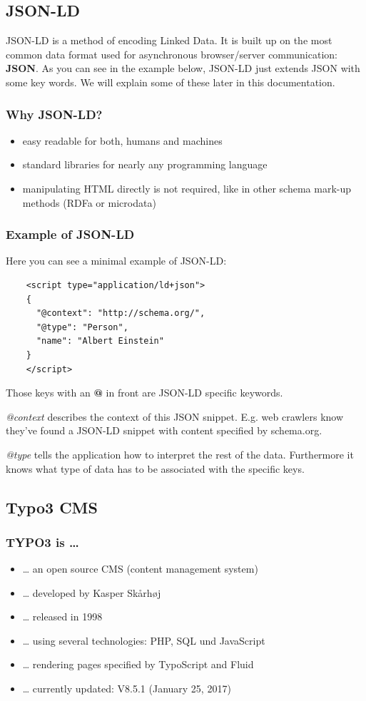 \documentclass[12pt]{article}
\begin{document}
\subsection{JSON-LD}
JSON-LD is a method of encoding Linked Data. It is built up on the most common data format used for asynchronous browser/server communication: \textbf{JSON}. As you can see in the example below, JSON-LD just extends JSON with some key words. We will explain some of these later in this documentation.

\subsubsection{Why JSON-LD?}
\begin{itemize}
	\item easy readable for both, humans and machines
	\item standard libraries for nearly any programming language
	\item manipulating HTML directly is not required, like in other schema mark-up methods (RDFa or microdata)
\end{itemize}

\subsubsection{Example of JSON-LD}
Here you can see a minimal example of JSON-LD:
\begin{lstlisting}
	<script type="application/ld+json">
	{
	  "@context": "http://schema.org/",
	  "@type": "Person",
	  "name": "Albert Einstein"
	}
	</script>
\end{lstlisting}
Those keys with an \textbf{@} in front are JSON-LD specific keywords. 

\emph{@context} describes the context of this JSON snippet. E.g. web crawlers know they've found a JSON-LD snippet with content specified by schema.org. 

\emph{@type} tells the application how to interpret the rest of the data. Furthermore it knows what type of data has to be associated with the specific keys.
	


\subsection{Typo3 CMS}
\subsubsection{TYPO3 is \dots{}}
\begin{itemize}
	\item \dots{} an open source CMS (content management system)
	\item \dots{} developed by Kasper Skårhøj
	\item \dots{} released in 1998
	\item \dots{} using several technologies: PHP, SQL und JavaScript
	\item \dots{} rendering pages specified by TypoScript and Fluid
	\item \dots{} currently updated: V8.5.1 (January 25, 2017)
\end{itemize}
\end{document}
